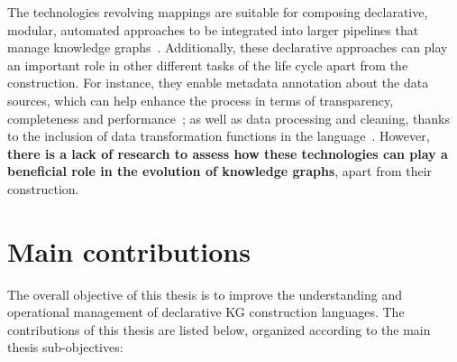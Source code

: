 
The technologies revolving mappings are suitable for composing declarative, modular, automated approaches to be integrated into larger pipelines that manage knowledge graphs~\parencite{simsek2021knowledge,cimmino2022helio,grassi2023composable}. 
Additionally, these declarative approaches can play an important role in other different tasks of the life cycle apart from the construction. 
For instance, they enable metadata annotation about the data sources, which can help enhance the process in terms of transparency, completeness and performance~\parencite{chaves2021morph-csv,vidal2023knowledge}; as well as 
data processing and cleaning, thanks to the inclusion of data transformation functions in the language~\parencite{debruyne2016r2rmlf,junior2016funul,jozashoori2020funmap,DeMeester2017fno_dbpedia}.
However, \textbf{there is a lack of research to assess how these technologies can play a beneficial role in the evolution of knowledge graphs}, apart from their construction.





\section{Main contributions}

The overall objective of this thesis is to improve the understanding and operational management of declarative KG construction languages. The contributions of this thesis are listed below, organized according to the main thesis sub-objectives:

